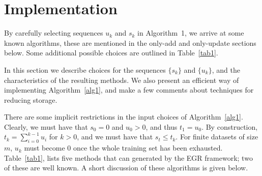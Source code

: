 \documentclass[11pt]{article}
\begin{document}
\bigskip


 \section{Implementation}  \label{implementation}
 
By carefully selecting sequences $u_k$ and $s_k$ in Algorithm~1, we arrive at some known algorithms, these are mentioned in the only-add and only-update sections below. Some additional possible choices are outlined in Table~\ref{tab1}.

 In this section we describe  choices for the sequences $\{s_k\}$ and $\{u_k\}$, and the characteristics of the resulting methods. We also present an efficient way of implementing Algorithm~\ref{alg1}, and make a few comments about techniques for reducing storage.

There are some implicit restrictions in the input choices of Algorithm~\ref{alg1}. Clearly, we must have that $s_0=0$ and $u_0>0$, and thus $t_1 = u_0$.  By construction, $t_k = \sum_{i=0}^{k-1} u_i$ for $k>0$, and we must have that $s_t \leq t_k$. For finite datasets of size $m$, $u_k$ must become $0$ once the whole training set has been exhausted.
Table~\ref{tab1},  lists five methods that can generated by the EGR framework; two of these are well known. A short discussion of these algorithms is given below.
\end{document}

